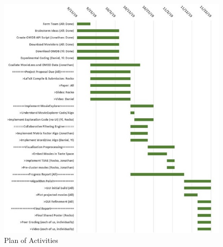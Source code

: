 \documentclass[sigchi, 12pt, nonacm=true, timestamp=true, screen=true]{acmart}
\begin{document}


%



%

\begin{figure}
	\centering
	\includegraphics[width=1\linewidth]{ProjectPlan}
	\caption[Project Plan]{Plan of Activities}
	\label{fig:projectplan}
\end{figure}
\end{document}
